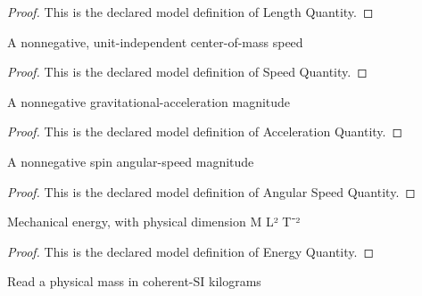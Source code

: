 \begin{proof}
  This is the declared model definition of Length Quantity.
\end{proof}
\begin{definition}
  \label{def:physics:phyx-mini-0788:phyxminiproblems-problemphyxmini0788-speedquantity}
  A nonnegative, unit-independent center-of-mass speed
\end{definition}
\begin{proof}
  This is the declared model definition of Speed Quantity.
\end{proof}
\begin{definition}
  \label{def:physics:phyx-mini-0788:phyxminiproblems-problemphyxmini0788-accelerationquantity}
  A nonnegative gravitational-acceleration magnitude
\end{definition}
\begin{proof}
  This is the declared model definition of Acceleration Quantity.
\end{proof}
\begin{definition}
  \label{def:physics:phyx-mini-0788:phyxminiproblems-problemphyxmini0788-angularspeedquantity}
  A nonnegative spin angular-speed magnitude
\end{definition}
\begin{proof}
  This is the declared model definition of Angular Speed Quantity.
\end{proof}
\begin{definition}
  \label{def:physics:phyx-mini-0788:phyxminiproblems-problemphyxmini0788-energyquantity}
  Mechanical energy, with physical dimension M L² T⁻²
\end{definition}
\begin{proof}
  This is the declared model definition of Energy Quantity.
\end{proof}
\begin{definition}
  \label{def:physics:phyx-mini-0788:phyxminiproblems-problemphyxmini0788-massinkilograms}
  Read a physical mass in coherent-SI kilograms
\end{definition}
